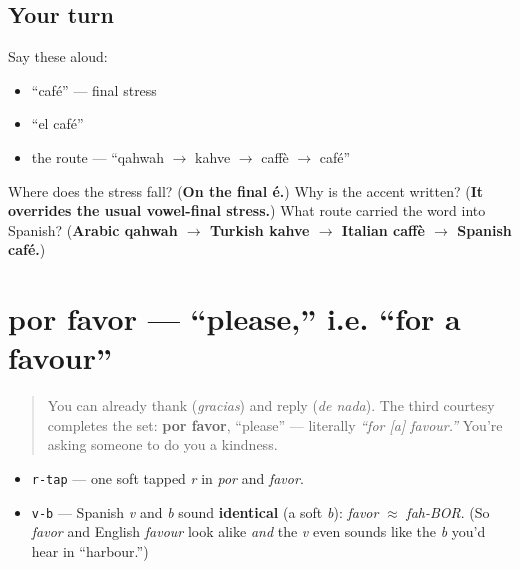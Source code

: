 \subsection*{Your turn}
Say these aloud:

\begin{itemize}
\raggedright
  \item “café” — final stress
  \item “el café”
  \item the route — “qahwah $\to$ kahve $\to$ caffè $\to$ café”
\end{itemize}

\begin{tcolorbox}[breakable,colback=teal!4,colframe=teal!35!black,title={Before you move on}]
Where does the stress fall? (\textbf{On the final é.}) Why is the accent written? (\textbf{It overrides the usual vowel-final stress.}) What route carried the word into Spanish? (\textbf{Arabic qahwah $\to$ Turkish kahve $\to$ Italian caffè $\to$ Spanish café.})
\end{tcolorbox}
\section[por favor]{por favor — \textquotedblleft{}please,\textquotedblright{} i.e. \textquotedblleft{}for a favour\textquotedblright{}}

\label{lesson:ES-C06-por-favor}



\begin{quote}
You can already thank (\emph{gracias}) and reply (\emph{de nada}). The third courtesy completes the set: \textbf{por favor}, \textquotedblleft{}please\textquotedblright{} — literally \emph{\textquotedblleft{}for {[}a{]} favour.\textquotedblright{}} You're asking someone to do you a kindness.
\end{quote}

\begin{sounds}
\begin{itemize}
\raggedright
  \item \texttt{r-tap} — one soft tapped \emph{r} in \emph{por} and \emph{favor}.
  \item \texttt{v-b} — Spanish \emph{v} and \emph{b} sound \textbf{identical} (a soft \emph{b}): \emph{favor} $\approx$ \emph{fah-BOR}. (So \emph{favor} and English \emph{favour} look alike \emph{and} the \emph{v} even sounds like the \emph{b} you'd hear in \textquotedblleft{}harbour.\textquotedblright{})
\end{itemize}
\end{sounds}

